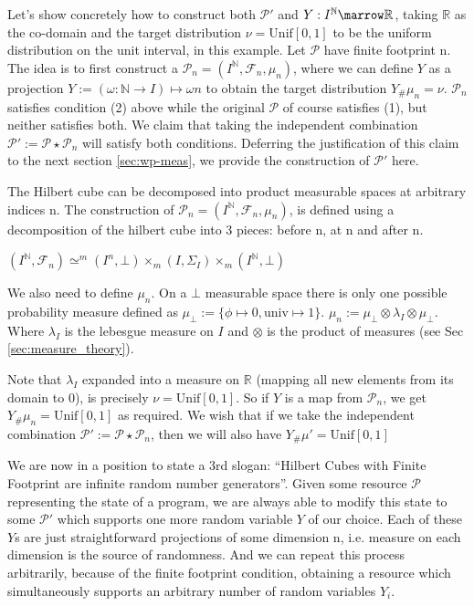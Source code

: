 Let's show concretely how to construct both $\mathcal{P'}$ and $Y : I^\mathbb{N} \marrow \mathbb{R}$, taking $\mathbb{R}$ as the co-domain and
the target distribution $\nu=\mathrm{Unif}[0,1]$ to be the uniform distribution on the unit interval,
in this example. Let $\mathcal{P}$ have finite footprint n. The idea is to first construct a $\mathcal{P}_n = (I^\mathbb{N}, \mathcal{F}_n, \mu_n)$, 
where we can define $Y$ as a projection  $Y := (\omega : \mathbb{N} \to I) \mapsto \omega n$ to obtain the target distribution $Y_\#\mu_n = \nu$.
$\mathcal{P}_n$ satisfies condition (2) above while the original $\mathcal{P}$ of course satisfies (1), but neither satisfies both. We claim that taking the
independent combination $\mathcal{P'} := \mathcal{P} \star \mathcal{P}_n$ will satisfy both conditions. Deferring the justification of this claim to
the next section \ref{sec:wp-meas}, we provide the construction of $\mathcal{P'}$ here.

The Hilbert cube can be decomposed into product measurable spaces
at arbitrary indices n. The construction of $\mathcal{P}_n = (I^\mathbb{N}, \mathcal{F}_n, \mu_n)$, is defined using a decomposition of the hilbert cube
into 3 pieces: before n, at n and after n.

$(I^\mathbb{N}, \mathcal{F}_n) \simeq^m (I^n, \bot) \times_m (I, \Sigma_I) \times_m (I^\mathbb{N}, \bot)$

We also need to define $\mu_n$. On a $\bot$ measurable space there is only one possible probability measure defined as $\mu_\bot := \{\phi \mapsto 0, \mathrm{univ} \mapsto 1\}$.
$\mu_n := \mu_\bot \otimes \lambda_I \otimes \mu_\bot$. Where $\lambda_I$ is the lebesgue measure on $I$ and $\otimes$ is the product of measures (see Sec \ref{sec:measure_theory}).

Note that $\lambda_I$ expanded into a measure on $\mathbb{R}$ (mapping all new elements from its domain to 0), is precisely $\nu=\mathrm{Unif}[0,1]$. So if $Y$ is a map from
$\mathcal{P}_n$, we get $Y_\#\mu_n = \mathrm{Unif[0,1]}$ as required. We wish that if we take the independent combination $\mathcal{P'} := \mathcal{P} \star \mathcal{P}_n$,
then we will also have $Y_\#\mu' = \mathrm{Unif[0,1]}$

We are now in a position to state a 3rd slogan: ``Hilbert Cubes with Finite Footprint are infinite random number generators''. Given some resource $\mathcal{P}$ representing
the state of a program, we are always able to modify this state to some $\mathcal{P'}$ which supports one more random variable $Y$ of our choice. Each of these $Y$s are
just straightforward projections of some dimension n, i.e. measure on each dimension is the source of randomness. And we can repeat this process arbitrarily, because
of the finite footprint condition, obtaining a resource
which simultaneously supports an arbitrary number of random variables $Y_i$.

